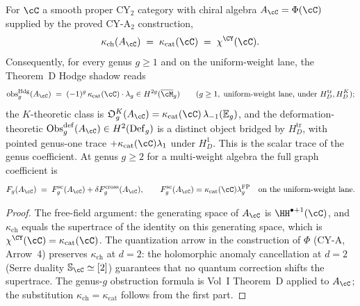 \begin{proposition}[\texorpdfstring{$\kappa_{\mathrm{cat}} = \kappa_{\mathrm{ch}}$}{kappa-cat = kappa-ch} under \texorpdfstring{$\Phi$}{Phi} at \texorpdfstring{$d = 2$}{d = 2}]
\label{prop:kappa-cat-chi-cy}
For $\cC$ a smooth proper CY$_2$ category with chiral algebra $A_\cC = \Phi(\cC)$ supplied by the proved CY-A$_2$ construction,
\[
 \kappa_{\mathrm{ch}}(A_\cC) \;=\; \kappa_{\mathrm{cat}}(\cC) \;=\; \chi^{\CY}(\cC).
\]
Consequently, for every genus $g \geq 1$ and on the uniform-weight lane, the Theorem~D Hodge shadow reads
\[
 \mathrm{obs}_g^{\mathrm{Hdg}}(A_\cC) \;=\; (-1)^g\,\kappa_{\mathrm{cat}}(\cC) \cdot \lambda_g
 \in H^{2g}(\overline{\cM}_g)
 \qquad (g \geq 1,\;\textup{uniform-weight lane, under } H_D^{\mathrm{tr}}, H_D^K);
\]
the $K$-theoretic class is $\mathfrak O_g^K(A_\cC) = \kappa_{\mathrm{cat}}(\cC)\,\lambda_{-1}(\mathbb E_g)$, and the deformation-theoretic $\operatorname{Obs}^{\mathrm{def}}_g(A_\cC) \in H^2(\operatorname{Def}_g)$ is a distinct object bridged by $H_D^{\mathrm{tr}}$, with pointed genus-one trace $+\kappa_{\mathrm{cat}}(\cC)\lambda_1$ under $H_D^1$.  This is the scalar trace of the genus coefficient.  At genus $g \geq 2$ for a multi-weight algebra the full graph coefficient is
\[
 F_g(A_\cC) \;=\; F_g^{\mathrm{sc}}(A_\cC) + \delta F_g^{\mathrm{cross}}(A_\cC),
 \qquad
 F_g^{\mathrm{sc}}(A_\cC)=\kappa_{\mathrm{cat}}(\cC)\lambda_g^{\mathrm{FP}}
 \quad\textup{on the uniform-weight lane}.
\]
\end{proposition}

\begin{proof}
The free-field argument: the generating space of $A_\cC$ is $\HH^{\bullet+1}(\cC)$, and $\kappa_{\mathrm{ch}}$ equals the supertrace of the identity on this generating space, which is $\chi^{\CY}(\cC) = \kappa_{\mathrm{cat}}(\cC)$. The quantization arrow in the construction of $\Phi$ (CY-A, Arrow~4) preserves $\kappa_{\mathrm{ch}}$ at $d = 2$: the holomorphic anomaly cancellation at $d = 2$ (Serre duality $\mathbb{S}_\cC \simeq [2]$) guarantees that no quantum correction shifts the supertrace. The genus-$g$ obstruction formula is Vol~I Theorem~D applied to $A_\cC$; the substitution $\kappa_{\mathrm{ch}} = \kappa_{\mathrm{cat}}$ follows from the first part.
\end{proof}

